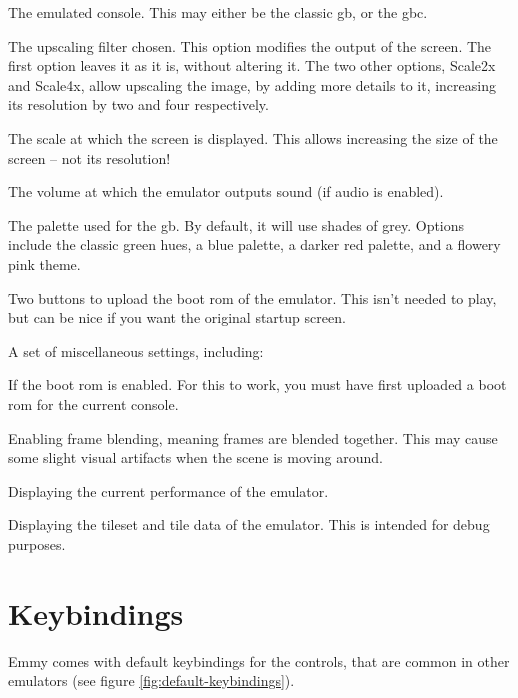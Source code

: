 \begin{compactitem}
	\item The emulated console. This may either be the classic \glsdesc{gb}, or the \glsdesc{gbc}.
	\item The upscaling filter chosen. This option modifies the output of the screen. The first option leaves it as it is, without altering it. The two other options, Scale2x and Scale4x, allow upscaling the image, by adding more details to it, increasing its resolution by two and four respectively.
	\item The scale at which the screen is displayed. This allows increasing the size of the screen -- not its resolution!
	\item The volume at which the emulator outputs sound (if audio is enabled).
	\item The palette used for the \glsdesc{gb}. By default, it will use shades of grey. Options include the classic green hues, a blue palette, a darker red palette, and a flowery pink theme.
	\item Two buttons to upload the boot \gls{rom} of the emulator. This isn't needed to play, but can be nice if you want the original startup screen.
	\item A set of miscellaneous settings, including:
	\begin{compactitem}
		\item If the boot \gls{rom} is enabled. For this to work, you must have first uploaded a boot \gls{rom} for the current console.
		\item Enabling frame blending, meaning frames are blended together. This may cause some slight visual artifacts when the scene is moving around.
		\item Displaying the current performance of the emulator.
		\item Displaying the tileset and tile data of the emulator. This is intended for debug purposes.
	\end{compactitem}
\end{compactitem}

\section{Keybindings}

Emmy comes with default keybindings for the controls, that are common in other emulators (see figure \ref{fig:default-keybindings}). 

